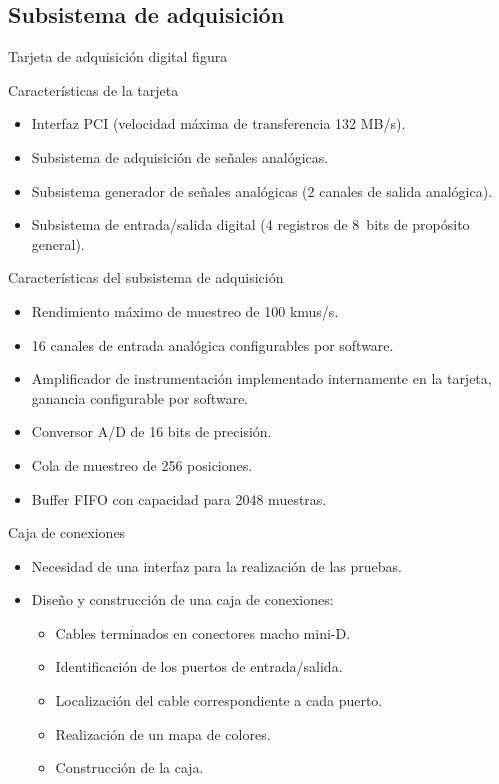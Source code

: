 \documentclass[utf8, compress]			{beamer}
\begin{document}
\subsection{Subsistema de adquisición}

\begin{frame}{Tarjeta de adquisición digital}
    \alert{figura}
\end{frame}

\begin{frame}{Características de la tarjeta}
    \begin{itemize}
	\item Interfaz PCI (velocidad máxima de transferencia 132 MB/s).
	\item Subsistema de adquisición de señales analógicas.
	\item Subsistema generador de señales analógicas (2 canales de
	    salida analógica).
	\item Subsistema de entrada/salida digital (4 registros de 8~bits
	    de propósito general).
    \end{itemize}
\end{frame}

\begin{frame}{Características del subsistema de adquisición}
    \begin{itemize}
	\item Rendimiento máximo de muestreo de 100 kmus/s.
	\item 16 canales de entrada analógica configurables por software.
	\item Amplificador de instrumentación implementado internamente en
	    la tarjeta, ganancia configurable por software.
	\item Conversor A/D de 16 bits de precisión.
	\item Cola de muestreo de 256 posiciones.
	\item Buffer FIFO con capacidad para 2048 muestras.
    \end{itemize}
\end{frame}

\begin{frame}{Caja de conexiones}
    \begin{itemize}
	\item Necesidad de una interfaz para la realización de las pruebas.
	\item Diseño y construcción de una caja de conexiones:
	    \begin{itemize}
		\item Cables terminados en conectores macho mini-D.
		\item Identificación de los puertos de entrada/salida.
		\item Localización del cable correspondiente a cada puerto.
		\item Realización de un mapa de colores.
		\item Construcción de la caja.
	    \end{itemize}
    \end{itemize}
\end{frame}
\end{document}
